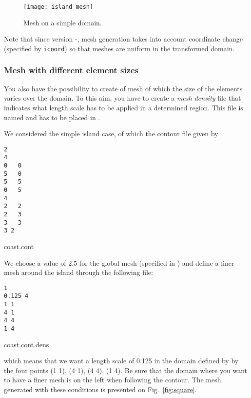 \begin{figure}[htpb]
\centering
\parbox{.7\textwidth}{
\texttt{[image: island\_mesh]}
}\parbox{.3\textwidth}{
\caption{Mesh on a simple domain.}
}
\end{figure}

Note that since version \diva-\divaversion, mesh generation takes into account coordinate change (specified by \texttt{icoord}) so that meshes are uniform in the transformed domain. 


\subsubsection{Mesh with different element sizes}

You also have the possibility to create of mesh of which the size of the elements varies over the domain. To this aim, you have to create a \textit{mesh density} file that indicates what length scale has to be applied in a determined region. This file is named  and has to be placed in .

We considered the simple island case, of which the contour file given by

\begin{exfile}[htpb]
\begin{footnotesize}
\begin{verbatim}
2
4
0	0
5	0
5	5
0	5
4
2	2
2	3
3	3
3 2
\end{verbatim}
\end{footnotesize}
\caption{coast.cont}
\end{exfile}

We choose a value of $2.5$ for the global mesh (specified in ) and define a finer mesh around the island through the following  file:

\begin{exfile}[htpb]
\begin{footnotesize}
\begin{verbatim}
1
0.125 4
1 1
4 1
4 4
1 4
\end{verbatim}
\end{footnotesize}
\caption{coast.cont.dens}
\end{exfile}

which means that we want a length scale of 0.125 in the domain defined by by the four points (1 1), (4 1), (4 4), (1 4). Be sure that the domain where you want to have a finer mesh is on the left when following the contour. The mesh generated with these conditions is presented on Fig.~\ref{fig:square}.

